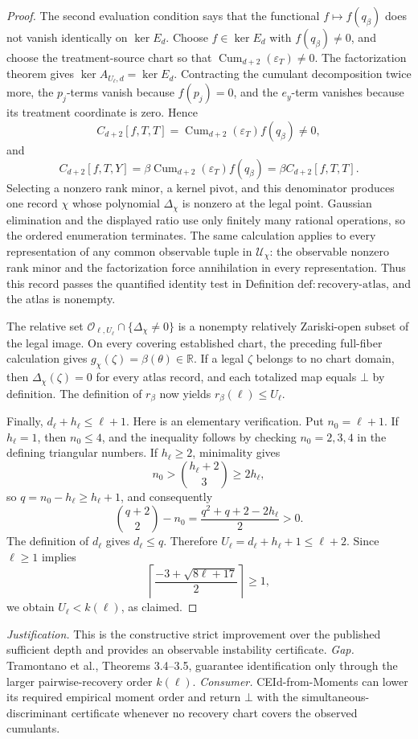 \documentclass{article}
\begin{document}
\begin{proof}
The second evaluation condition says that the functional \(f\mapsto f(q_\beta)\) does not vanish identically on \(\ker E_d\).  Choose \(f\in\ker E_d\) with \(f(q_\beta)\ne0\), and choose the treatment-source chart so that \(\operatorname{Cum}_{d+2}(\varepsilon_T)\ne0\).  The factorization theorem gives \(\ker A_{U_\ell,d}=\ker E_d\).  Contracting the cumulant decomposition twice more, the \(p_j\)-terms vanish because \(f(p_j)=0\), and the \(e_y\)-term vanishes because its treatment coordinate is zero.  Hence
\[
 C_{d+2}[f,T,T]=\operatorname{Cum}_{d+2}(\varepsilon_T)f(q_\beta)\ne0,
\]
and
\[
 C_{d+2}[f,T,Y]
 =\beta\operatorname{Cum}_{d+2}(\varepsilon_T)f(q_\beta)
 =\beta C_{d+2}[f,T,T].
\]
Selecting a nonzero rank minor, a kernel pivot, and this denominator produces one record \(\chi\) whose polynomial \(\Delta_\chi\) is nonzero at the legal point.  Gaussian elimination and the displayed ratio use only finitely many rational operations, so the ordered enumeration terminates.  The same calculation applies to every representation of any common observable tuple in \(\mathcal U_\chi\): the observable nonzero rank minor and the factorization force annihilation in every representation.  Thus this record passes the quantified identity test in Definition \(\mathrm{def:recovery\mbox{-}atlas}\), and the atlas is nonempty.

The relative set \(\mathcal O_{\ell,U_\ell}\cap\{\Delta_\chi\ne0\}\) is a nonempty relatively Zariski-open subset of the legal image.  On every covering established chart, the preceding full-fiber calculation gives \(g_\chi(\zeta)=\beta(\theta)\in\mathbb R\).  If a legal \(\zeta\) belongs to no chart domain, then \(\Delta_\chi(\zeta)=0\) for every atlas record, and each totalized map equals \(\bot\) by definition.  The definition of \(r_\beta\) now yields \(r_\beta(\ell)\le U_\ell\).

Finally, \(d_\ell+h_\ell\le\ell+1\).  Here is an elementary verification.  Put \(n_0=\ell+1\).  If \(h_\ell=1\), then \(n_0\le4\), and the inequality follows by checking \(n_0=2,3,4\) in the defining triangular numbers.  If \(h_\ell\ge2\), minimality gives
\[
 n_0>\binom{h_\ell+2}{3}\ge2h_\ell,
\]
so \(q=n_0-h_\ell\ge h_\ell+1\), and consequently
\[
 \binom{q+2}{2}-n_0
 =\frac{q^2+q+2-2h_\ell}{2}>0.
\]
The definition of \(d_\ell\) gives \(d_\ell\le q\).  Therefore \(U_\ell=d_\ell+h_\ell+1\le\ell+2\).  Since \(\ell\ge1\) implies
\[
 \left\lceil\frac{-3+\sqrt{8\ell+17}}2\right\rceil\ge1,
\]
we obtain \(U_\ell<k(\ell)\), as claimed.
\end{proof}
\par\smallskip\noindent \textit{Justification.} This is the constructive strict improvement over the published sufficient depth and provides an observable instability certificate. \textit{Gap.} Tramontano et al., Theorems 3.4--3.5, guarantee identification only through the larger pairwise-recovery order \(k(\ell)\). \textit{Consumer.} CEId-from-Moments can lower its required empirical moment order and return \(\bot\) with the simultaneous-discriminant certificate whenever no recovery chart covers the observed cumulants.
\end{document}
